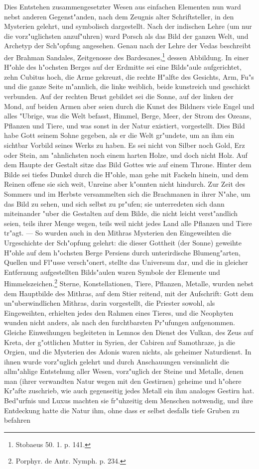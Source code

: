 \documentclass[a4paper, 11pt, oneside, polutonikogreek, german]{article}
\begin{document}
Dies Entstehen zusammengesetzter Wesen aus einfachen Elementen nun ward nebst anderen Gegenst"anden, nach dem Zeugnis alter Schriftsteller, in den Mysterien gelehrt, und symbolisch dargestellt. Nach der indischen Lehre (um nur die vorz"uglichsten anzuf"uhren) ward Porsch als das Bild der ganzen Welt, und Archetyp der Sch"opfung angesehen. Genau nach der Lehre der Vedas beschreibt der Brahman Sandales, Zeitgenosse des Bardesanes,\footnote{Stobaeus 50. 1. p. 141.} dessen Abbildung. In einer H"ohle des h"ochsten Berges auf der Erdmitte sei eine Bilds"aule aufgerichtet, zehn Cubitus hoch, die Arme gekreuzt, die rechte H"alfte des Gesichts, Arm, Fu"s und die ganze Seite m"annlich, die linke weiblich, beide kunstreich und geschickt verbunden. Auf der rechten Brust gebildet sei die Sonne, auf der linken der Mond, auf beiden Armen aber seien durch die Kunst des Bildners viele Engel und alles "Ubrige, was die Welt befasst, Himmel, Berge, Meer, der Strom des Ozeans, Pflanzen und Tiere, und was sonst in der Natur existiert, vorgestellt. Dies Bild habe Gott seinem Sohne gegeben, als er die Welt gr"undete, um an ihm ein sichtbar Vorbild seines Werks zu haben. Es sei nicht von Silber noch Gold, Erz oder Stein, am "ahnlichsten noch einem harten Holze, und doch nicht Holz. Auf dem Haupte der Gestalt sitze das Bild Gottes wie auf einem Throne. Hinter dem Bilde sei tiefes Dunkel durch die H"ohle, man gehe mit Fackeln hinein, und dem Reinen offene sie sich weit, Unreine aber k"onnten nicht hindurch. Zur Zeit des Sommers und im Herbste versammelten sich die Brachmanen in ihrer N"ahe, um das Bild zu sehen, und sich selbst zu pr"ufen; sie unterredeten sich dann miteinander "uber die Gestalten auf dem Bilde, die nicht leicht verst"andlich seien, teils ihrer Menge wegen, teils weil nicht jedes Land alle Pflanzen und Tiere tr"agt. --- So wurden auch in den Mithras Mysterien den Eingeweihten die Urgeschichte der Sch"opfung gelehrt: die dieser Gottheit (der Sonne) geweihte H"ohle auf dem h"ochsten Berge Persiens durch unterirdische Blumeng"arten, Quellen und Fl"usse versch"onert, stellte das Universum dar, und die in gleicher Entfernung aufgestellten Bilds"aulen waren Symbole der Elemente und Himmelszeichen.\footnote{Porphyr. de Antr. Nymph. p. 234.} Sterne, Konstellationen, Tiere, Pflanzen, Metalle, wurden nebst dem Hauptbilde des Mithras, auf dem Stier reitend, mit der Aufschrift: Gott dem un"uberwindlichen Mithras, darin vorgestellt, die Priester sowohl, als Eingeweihten, erhielten jedes den Rahmen eines Tieres, und die Neophyten wunden nicht anders, als nach den furchtbarsten Pr"ufungen aufgenommen. Gleiche Einweihungen begleiteten in Lemnos den Dienst des Vulkan, des Zeus auf Kreta, der g"ottlichen Mutter in Syrien, der Cabiren auf Samothraze, ja die Orgien, und die Mysterien des Adonis waren nichts, als geheimer Naturdienst. In ihnen wurde vorz"uglich gelehrt und durch Anschauungen versinnlicht die allm"ahlige Entstehung aller Wesen, vorz"uglich der Steine und Metalle, denen man (ihrer verwandten Natur wegen mit den Gestirnen) geheime und h"ohere Kr"afte zuschrieb, wie auch gegenseitig jedes Metall ein ihm analoges Gestirn hat. Bed"urfnis und Luxus machten sie fr"uhzeitig dem Menschen notwendig, und ihre Entdeckung hatte die Natur ihm, ohne dass er selbst desfalls tiefe Gruben zu befahren 
\end{document}
